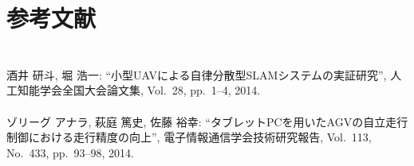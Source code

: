 \chapter*{参考文献}
\lhead[参考文献]{}
\thispagestyle{empty}

\newpage

\subsection*{}
\begin{mythebibliography}{}



\leavevmode \\酒井 研斗, 堀 浩一:
\newblock ``小型UAVによる自律分散型SLAMシステムの実証研究'',
\newblock 人工知能学会全国大会論文集, Vol.~28, pp.~1--4, 2014.
\\


\leavevmode \\ゾリーグ アナラ, 萩庭 篤史, 佐藤 裕幸:
\newblock ``タブレットPCを用いたAGVの自立走行制御における走行精度の向上'',
\newblock 電子情報通信学会技術研究報告, Vol.~113, No.~433, pp.~93--98, 2014.
\\


\end{mythebibliography}
